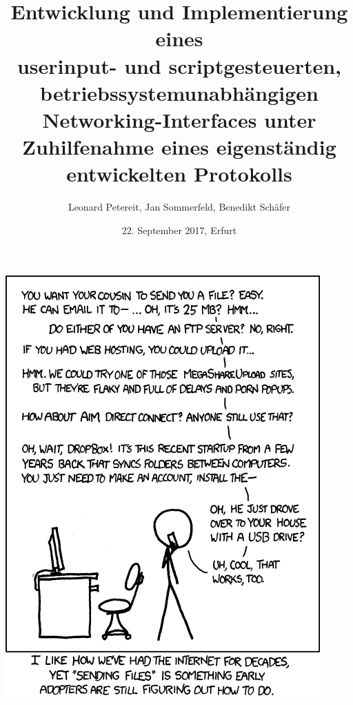 \documentclass[newPxFont,numfooter,sectionpages]{beamer}
\title{\Large{{Entwicklung und Implementierung eines\\ userinput- und scriptgesteuerten, betriebssystemunabhängigen Networking-Interfaces unter Zuhilfenahme eines eigenständig entwickelten Protokolls}}}
\date{22. September 2017, Erfurt}
\author{Leonard Petereit, Jan Sommerfeld, Benedikt Schäfer}
\institute{\footnotesize{Spezialschulteil des Albert-Schweitzer Gymnasiums Erfurt}}
\begin{document}
\begin{frame}
\vspace*{8mm}
\centering\includegraphics[scale=0.34]{in}
\end{frame}

%
%

\maketitle

%
%
%
%
%
\end{document}
